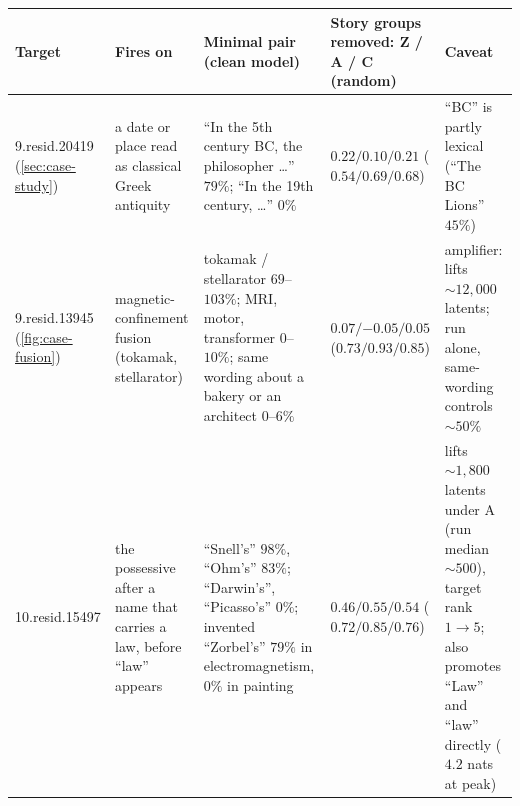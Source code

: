 \documentclass[10pt]{article}
\begin{document}
\begin{table}[!htbp]   %
\centering
\small
\setlength{\tabcolsep}{4pt}
\begin{tabular}{p{2.0cm}p{2.7cm}p{3.0cm}p{2.5cm}p{2.3cm}}
\toprule
\textbf{Target} & \textbf{Fires on} & \textbf{Minimal pair (clean model)} & \textbf{Story groups removed: Z / A / C (random)} & \textbf{Caveat} \\
\midrule
9.resid.20419 (\cref{sec:case-study}) & a date or place read as classical Greek antiquity & ``In the 5th century BC, the philosopher \ldots'' $79\%$; ``In the 19th century, \ldots'' $0\%$ & $0.22 / 0.10 / 0.21$ \newline ($0.54 / 0.69 / 0.68$) & ``BC'' is partly lexical (``The BC Lions'' $45\%$) \\
9.resid.13945 (\cref{fig:case-fusion}) & magnetic-confinement fusion (tokamak, stellarator) & tokamak / stellarator $69$--$103\%$; MRI, motor, transformer $0$--$10\%$; same wording about a bakery or an architect $0$--$6\%$ & $0.07 / {-0.05} / 0.05$ \newline ($0.73 / 0.93 / 0.85$) & amplifier: lifts ${\sim}12{,}000$ latents; run alone, same-wording controls ${\sim}50\%$ \\
10.resid.15497 & the possessive after a name that carries a law, before ``law'' appears & ``Snell's'' $98\%$, ``Ohm's'' $83\%$; ``Darwin's'', ``Picasso's'' $0\%$; invented ``Zorbel's'' $79\%$ in electromagnetism, $0\%$ in painting & $0.46 / 0.55 / 0.54$ \newline ($0.72 / 0.85 / 0.76$) & lifts ${\sim}1{,}800$ latents under A (run median ${\sim}500$), target rank $1 \to 5$; also promotes ``Law'' and ``law'' directly ($4.2$ nats at peak) \\

\end{tabular}
\end{table}
\end{document}

